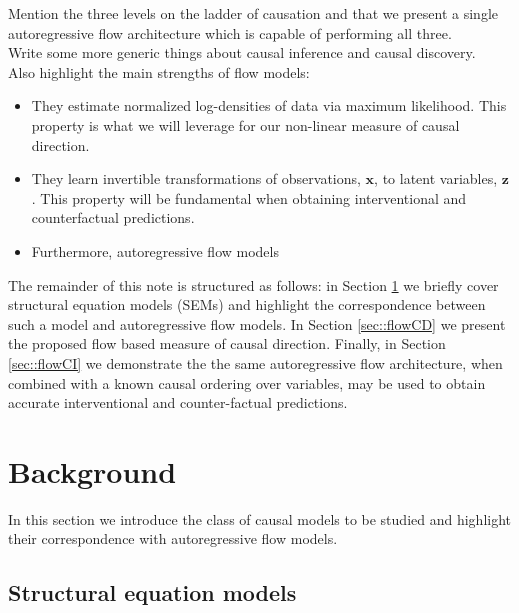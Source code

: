 \documentclass[]{article}
\begin{document}
\noindent Mention the three levels on the ladder of causation and that we present a single 
autoregressive flow architecture which is capable of performing all three. \\

\noindent Write some more generic things about causal inference and causal discovery.\\

\noindent Also highlight the main strengths of flow models:
\begin{itemize}
	\item They estimate normalized log-densities of data via maximum likelihood. This property is what we will leverage for our non-linear measure of causal direction. 
	\item They learn invertible transformations of observations, $\mathbf{x}$, to latent variables, $\mathbf{z}$. This property will be fundamental when obtaining interventional and counterfactual predictions. 
	\item Furthermore, autoregressive flow models 
\end{itemize}

The remainder of this note is structured as follows: in Section 
\ref{sec::background} we briefly cover structural equation models (SEMs) and highlight the correspondence between such a model and autoregressive flow models. In Section \ref{sec::flowCD}
we present the proposed flow based measure of causal direction. 
Finally, in Section \ref{sec::flowCI} we demonstrate the 
the same autoregressive flow architecture, when combined with a known causal ordering 
over variables, may be used to obtain accurate interventional and counter-factual predictions. 

\section{Background}
\label{sec::background}

In this section we 
introduce the class of causal models to be studied and 
highlight their correspondence with autoregressive flow models. 


\subsection{Structural equation models}
\label{sec::SEM}
\end{document}

